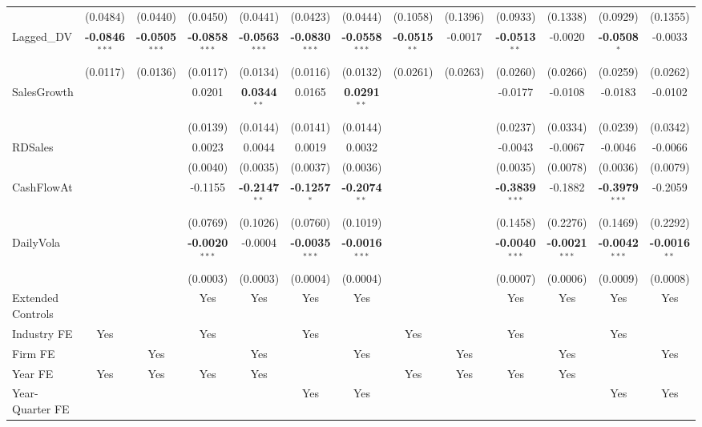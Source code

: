 \documentclass[11pt,a4paper]{article}
\begin{document}
\begin{table}[htbp]
\begin{tabular}{lcccccccccccc}
 & (0.0484) & (0.0440) & (0.0450) & (0.0441) & (0.0423) & (0.0444) & (0.1058) & (0.1396) & (0.0933) & (0.1338) & (0.0929) & (0.1355) \\
Lagged\_DV & \textbf{-0.0846}$^{***}$ & \textbf{-0.0505}$^{***}$ & \textbf{-0.0858}$^{***}$ & \textbf{-0.0563}$^{***}$ & \textbf{-0.0830}$^{***}$ & \textbf{-0.0558}$^{***}$ & \textbf{-0.0515}$^{**}$ & -0.0017 & \textbf{-0.0513}$^{**}$ & -0.0020 & \textbf{-0.0508}$^{*}$ & -0.0033 \\
 & (0.0117) & (0.0136) & (0.0117) & (0.0134) & (0.0116) & (0.0132) & (0.0261) & (0.0263) & (0.0260) & (0.0266) & (0.0259) & (0.0262) \\
SalesGrowth &  &  & 0.0201 & \textbf{0.0344}$^{**}$ & 0.0165 & \textbf{0.0291}$^{**}$ &  &  & -0.0177 & -0.0108 & -0.0183 & -0.0102 \\
 &  &  & (0.0139) & (0.0144) & (0.0141) & (0.0144) &  &  & (0.0237) & (0.0334) & (0.0239) & (0.0342) \\
RDSales &  &  & 0.0023 & 0.0044 & 0.0019 & 0.0032 &  &  & -0.0043 & -0.0067 & -0.0046 & -0.0066 \\
 &  &  & (0.0040) & (0.0035) & (0.0037) & (0.0036) &  &  & (0.0035) & (0.0078) & (0.0036) & (0.0079) \\
CashFlowAt &  &  & -0.1155 & \textbf{-0.2147}$^{**}$ & \textbf{-0.1257}$^{*}$ & \textbf{-0.2074}$^{**}$ &  &  & \textbf{-0.3839}$^{***}$ & -0.1882 & \textbf{-0.3979}$^{***}$ & -0.2059 \\
 &  &  & (0.0769) & (0.1026) & (0.0760) & (0.1019) &  &  & (0.1458) & (0.2276) & (0.1469) & (0.2292) \\
DailyVola &  &  & \textbf{-0.0020}$^{***}$ & -0.0004 & \textbf{-0.0035}$^{***}$ & \textbf{-0.0016}$^{***}$ &  &  & \textbf{-0.0040}$^{***}$ & \textbf{-0.0021}$^{***}$ & \textbf{-0.0042}$^{***}$ & \textbf{-0.0016}$^{**}$ \\
 &  &  & (0.0003) & (0.0003) & (0.0004) & (0.0004) &  &  & (0.0007) & (0.0006) & (0.0009) & (0.0008) \\
\midrule
Extended Controls &  &  & Yes & Yes & Yes & Yes &  &  & Yes & Yes & Yes & Yes \\
Industry FE & Yes &  & Yes &  & Yes &  & Yes &  & Yes &  & Yes &  \\
Firm FE &  & Yes &  & Yes &  & Yes &  & Yes &  & Yes &  & Yes \\
Year FE & Yes & Yes & Yes & Yes &  &  & Yes & Yes & Yes & Yes &  &  \\
Year-Quarter FE &  &  &  &  & Yes & Yes &  &  &  &  & Yes & Yes \\

\end{tabular}
\end{table}
\end{document}
